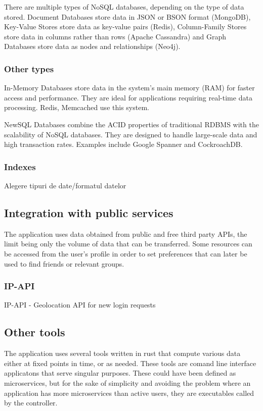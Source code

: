     There are multiple types of NoSQL databases, depending on the type of data stored. Document Databases store data in JSON or BSON format (MongoDB), Key-Value Stores store data as key-value pairs (Redis), Column-Family Stores store data in columns rather than rows (Apache Cassandra) and Graph Databases store data as nodes and relationships (Neo4j).

    \subsubsection{Other types}
    In-Memory Databases store data in the system's main memory (RAM) for faster access and performance. They are ideal for applications requiring real-time data processing. Redis, Memcached use this system.
    
    NewSQL Databases combine the ACID properties of traditional RDBMS with the scalability of NoSQL databases. They are designed to handle large-scale data and high transaction rates. Examples include Google Spanner and CockroachDB.
    
    \subsubsection{Indexes}

    Alegere tipuri de date/formatul datelor
    \subsection{Integration with public services}
    The application uses data obtained from public and free third party APIs, the limit being only the volume of data that can be transferred. Some resources can be accessed from the user's profile in order to set preferences that can later be used to find friends or relevant groups.

    \subsubsection{IP-API}
    IP-API - Geolocation API for new login requests

    
    \subsection{Other tools}
    \label{Other tools}
    The application uses several tools written in rust that compute various data either at fixed points in time, or as needed. These tools are comand line interface applicatons that serve singular purposes. These could have been defined as microservices, but for the sake of simplicity and avoiding the problem where an application has more microservices than active users, they are executables called by the controller.

